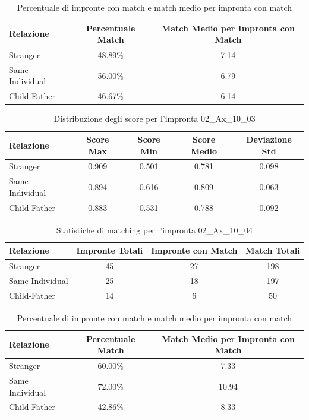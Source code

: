 \begin{table}[htbp]
\centering
\caption{Percentuale di impronte con match e match medio per impronta con match}
\label{tab:match_percentage_02_Ax_10_03}
\begin{tabular}{|l|c|c|}
\hline
\textbf{Relazione} & \textbf{Percentuale Match} & \textbf{Match Medio per Impronta con Match} \\
\hline
Stranger & 48.89\% & 7.14 \\
\hline
Same Individual & 56.00\% & 6.79 \\
\hline
Child-Father & 46.67\% & 6.14 \\
\hline
\end{tabular}
\end{table}


\begin{table}[htbp]
\centering
\caption{Distribuzione degli score per l'impronta 02\_Ax\_10\_03}
\label{tab:scores_02_Ax_10_03}
\begin{tabular}{|l|c|c|c|c|}
\hline
\textbf{Relazione} & \textbf{Score Max} & \textbf{Score Min} & \textbf{Score Medio} & \textbf{Deviazione Std} \\
\hline
Stranger & 0.909 & 0.501 & 0.781 & 0.098 \\
\hline
Same Individual & 0.894 & 0.616 & 0.809 & 0.063 \\
\hline
Child-Father & 0.883 & 0.531 & 0.788 & 0.092 \\
\hline
\end{tabular}
\end{table}


\begin{table}[htbp]
\centering
\caption{Statistiche di matching per l'impronta 02\_Ax\_10\_04}
\label{tab:results_02_Ax_10_04}
\begin{tabular}{|l|c|c|c|}
\hline
\textbf{Relazione} & \textbf{Impronte Totali} & \textbf{Impronte con Match} & \textbf{Match Totali} \\
\hline
Stranger & 45 & 27 & 198 \\
\hline
Same Individual & 25 & 18 & 197 \\
\hline
Child-Father & 14 & 6 & 50 \\
\hline
\end{tabular}
\end{table}


\begin{table}[htbp]
\centering
\caption{Percentuale di impronte con match e match medio per impronta con match}
\label{tab:match_percentage_02_Ax_10_04}
\begin{tabular}{|l|c|c|}
\hline
\textbf{Relazione} & \textbf{Percentuale Match} & \textbf{Match Medio per Impronta con Match} \\
\hline
Stranger & 60.00\% & 7.33 \\
\hline
Same Individual & 72.00\% & 10.94 \\
\hline
Child-Father & 42.86\% & 8.33 \\
\hline
\end{tabular}
\end{table}


